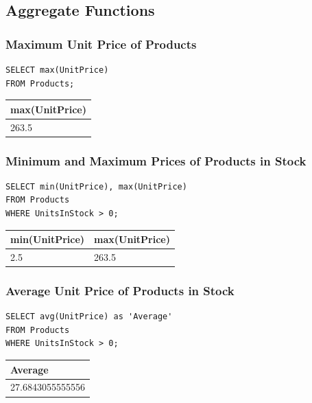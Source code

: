 \documentclass[10pt]{article}
\begin{document}
\subsection{Aggregate Functions}

\subsubsection{Maximum Unit Price of Products}

\begin{verbatim}
SELECT max(UnitPrice)
FROM Products;
\end{verbatim}

\begin{table}[H]
\begin{tabular}{|l|}
\hline
max(UnitPrice) \\
\hline
263.5 \\
\hline
\end{tabular}
\end{table}


\subsubsection{Minimum and Maximum Prices of Products in Stock}

\begin{verbatim}
SELECT min(UnitPrice), max(UnitPrice)
FROM Products
WHERE UnitsInStock > 0;
\end{verbatim}

\begin{table}[H]
\begin{tabular}{|l|l|}
\hline
min(UnitPrice)	& max(UnitPrice) \\
\hline
2.5	& 263.5 \\
\hline
\end{tabular}
\end{table}


\subsubsection{Average Unit Price of Products in Stock}

\begin{verbatim}
SELECT avg(UnitPrice) as 'Average'
FROM Products
WHERE UnitsInStock > 0;
\end{verbatim}

\begin{table}[H]
\begin{tabular}{|l|}
\hline
Average \\
\hline
27.6843055555556 \\
\hline
\end{tabular}
\end{table}
\end{document}
